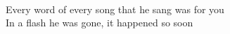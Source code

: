 \\
	Every word of every song that he sang was for you \\
	In a flash he was gone, it happened so soon \\


